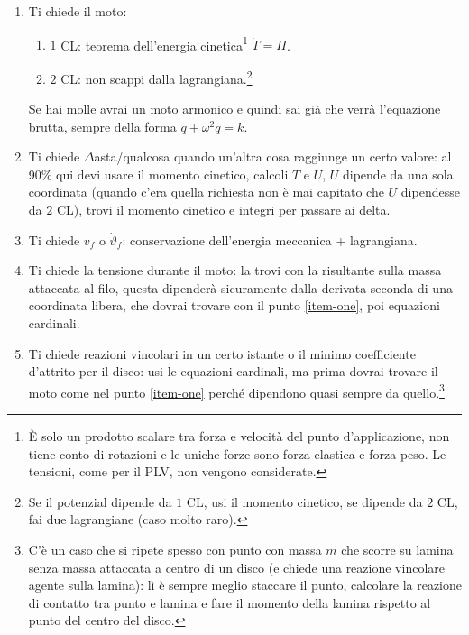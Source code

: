 \documentclass{article}
\begin{document}
\begin{enumerate}
    \item Ti chiede il moto:
        \begin{enumerate}
            \item $1$ CL: teorema dell'energia cinetica\footnote{È solo un prodotto scalare tra forza e velocità del punto d’applicazione, non tiene conto di rotazioni e le uniche forze sono forza elastica e forza peso. Le tensioni, come per il PLV, non vengono considerate.} $\dot{T} = \Pi$.
            \item $2$ CL: non scappi dalla lagrangiana.\footnote{Se il potenzial dipende da $1$ CL, usi il momento cinetico, se dipende da $2$ CL, fai due lagrangiane (caso molto raro).}
        \end{enumerate}
        Se hai molle avrai un moto armonico e quindi sai già che verrà l'equazione brutta, sempre della forma $\ddot{q} + \omega ^{2} q = k$. \label{item-one}
    \item Ti chiede $\Delta $asta/qualcosa quando un'altra cosa raggiunge un certo valore: al 90\% qui devi usare il momento cinetico, calcoli $T$ e $U$, $U$ dipende da una sola coordinata (quando c'era quella richiesta non è mai capitato che $U$ dipendesse da $2$ CL), trovi il momento cinetico e integri per passare ai delta.
    \item Ti chiede $v_{f}$ o $\dot{\vartheta}_{f}$: conservazione dell'energia meccanica + lagrangiana.
    \item Ti chiede la tensione durante il moto: la trovi con la risultante sulla massa attaccata al filo, questa dipenderà sicuramente dalla derivata seconda di una coordinata libera, che dovrai trovare con il punto \ref{item-one}, poi equazioni cardinali.
    \item Ti chiede reazioni vincolari in un certo istante o il minimo coefficiente d'attrito per il disco: usi le equazioni cardinali, ma prima dovrai trovare il moto come nel punto \ref{item-one} perché dipendono quasi sempre da quello.\footnote{C'è un caso che si ripete spesso con punto con massa $m$ che scorre su lamina senza massa attaccata a centro di un disco (e chiede una reazione vincolare agente sulla lamina): lì è sempre meglio staccare il punto, calcolare la reazione di contatto tra punto e lamina e fare il momento della lamina rispetto al punto del centro del disco.}
\end{enumerate}
\end{document}
